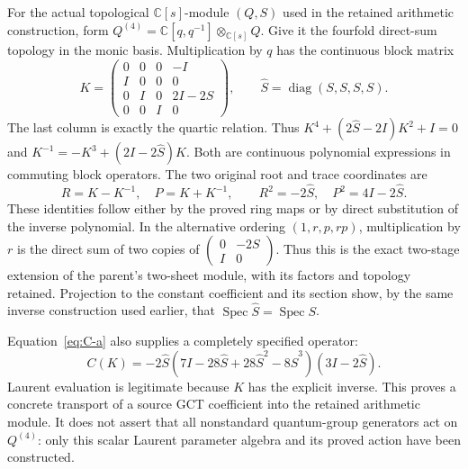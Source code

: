 For the actual topological $\mathbb C[s]$-module $(Q,S)$ used in
the retained arithmetic construction, form
$Q^{(4)}=\mathbb C[q,q^{-1}]\otimes_{\mathbb C[s]}Q$.
Give it the fourfold direct-sum topology in the monic basis.
Multiplication by $q$ has the continuous block matrix
\begin{equation}\label{eq:quartic-operator}
 K=
 \begin{pmatrix}
 0&0&0&-I\\
 I&0&0&0\\
 0&I&0&2I-2S\\
 0&0&I&0
 \end{pmatrix},\qquad
 \widehat S=\operatorname{diag}(S,S,S,S).
\end{equation}
The last column is exactly the quartic relation. Thus
$K^4+(2\widehat S-2I)K^2+I=0$ and
$K^{-1}=-K^3+(2I-2\widehat S)K$.
Both are continuous polynomial expressions in commuting block
operators. The two original root and trace coordinates are
\[
 R=K-K^{-1},\quad P=K+K^{-1},\qquad
 R^2=-2\widehat S,\quad P^2=4I-2\widehat S.
\]
These identities follow either by the proved ring maps or by direct
substitution of the inverse polynomial.
In the alternative ordering $(1,r,p,rp)$, multiplication by $r$
is the direct sum of two copies of
$\left(\begin{smallmatrix}0&-2S\\I&0\end{smallmatrix}\right)$.
Thus this is the exact two-stage extension of the parent's two-sheet
module, with its factors and topology retained.
Projection to the constant coefficient and its section show, by the
same inverse construction used earlier, that
$\operatorname{Spec}\widehat S=\operatorname{Spec}S$.

Equation~\eqref{eq:C-a} also supplies a completely specified operator:
\begin{equation}\label{eq:coefficient-operator}
 C(K)=
 -2\widehat S(7I-28\widehat S+28\widehat S^2-8\widehat S^3)
 (3I-2\widehat S).
\end{equation}
Laurent evaluation is legitimate because $K$ has the explicit inverse.
This proves a concrete transport of a source GCT coefficient into the
retained arithmetic module. It does not assert that all nonstandard
quantum-group generators act on $Q^{(4)}$: only this scalar Laurent
parameter algebra and its proved action have been constructed.

